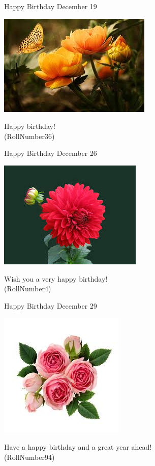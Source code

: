 \documentclass[table, landscape]{beamer}
\begin{document}
\begin{frame}{\color{red}Happy Birthday }
{December 19}
\begin{center}
\includegraphics[height=0.5\textheight]{flowers/f7.jpeg}

Happy birthday! \\ \vspace{0.5cm}{\Large name31} (RollNumber36)
\end{center}
\end{frame}
\begin{frame}{\color{red}Happy Birthday }
{December 26}
\begin{center}
\includegraphics[height=0.5\textheight]{flowers/f1.jpeg}

Wish you a very happy birthday! \\ \vspace{0.5cm}{\Large name4} (RollNumber4)
\end{center}
\end{frame}
\begin{frame}{\color{blue}Happy Birthday }
{December 29}
\begin{center}
\includegraphics[height=0.5\textheight]{flowers/f5.jpeg}

Have a happy birthday and a great year ahead! \\ \vspace{0.5cm}{\Large name87} (RollNumber94)
\end{center}
\end{frame}
\end{document}
